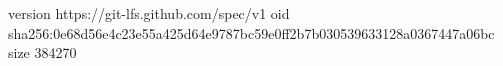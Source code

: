 version https://git-lfs.github.com/spec/v1
oid sha256:0e68d56e4c23e55a425d64e9787bc59e0ff2b7b030539633128a0367447a06bc
size 384270
